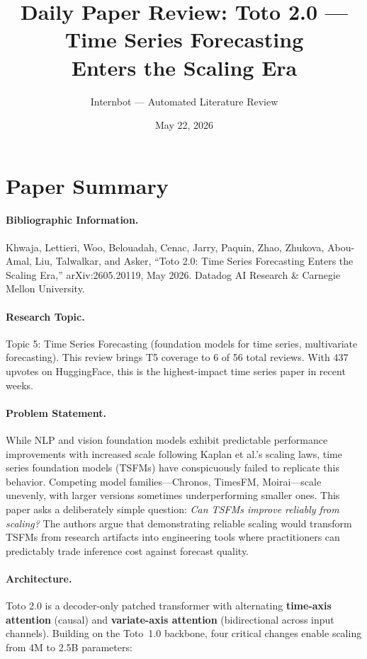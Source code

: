 \documentclass[11pt,a4paper]{article}
\title{Daily Paper Review: Toto 2.0 --- Time Series Forecasting\\Enters the Scaling Era}
\author{Internbot --- Automated Literature Review}
\date{May 22, 2026}
\begin{document}
\maketitle

\section*{Paper Summary}

\paragraph{Bibliographic Information.}
Khwaja, Lettieri, Woo, Belouadah, Cenac, Jarry, Paquin, Zhao, Zhukova, Abou-Amal, Liu, Talwalkar, and Asker, ``Toto 2.0: Time Series Forecasting Enters the Scaling Era,'' arXiv:2605.20119, May 2026. Datadog AI Research \& Carnegie Mellon University.

\paragraph{Research Topic.}
Topic 5: Time Series Forecasting (foundation models for time series, multivariate forecasting). This review brings T5 coverage to 6 of 56 total reviews. With 437 upvotes on HuggingFace, this is the highest-impact time series paper in recent weeks.

\paragraph{Problem Statement.}
While NLP and vision foundation models exhibit predictable performance improvements with increased scale following Kaplan et al.'s scaling laws, time series foundation models (TSFMs) have conspicuously failed to replicate this behavior. Competing model families---Chronos, TimesFM, Moirai---scale unevenly, with larger versions sometimes underperforming smaller ones. This paper asks a deliberately simple question: \emph{Can TSFMs improve reliably from scaling?} The authors argue that demonstrating reliable scaling would transform TSFMs from research artifacts into engineering tools where practitioners can predictably trade inference cost against forecast quality.

\paragraph{Architecture.}
Toto 2.0 is a decoder-only patched transformer with alternating \textbf{time-axis attention} (causal) and \textbf{variate-axis attention} (bidirectional across input channels). Building on the Toto~1.0 backbone, four critical changes enable scaling from 4M to 2.5B parameters:
\end{document}
